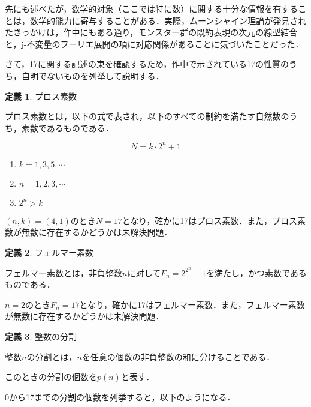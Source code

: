 \documentclass[10pt, a5paper, twoside]{jsarticle}
\theoremstyle{definition}
\newtheorem{dfn}{定義}
\begin{document}
			先にも述べたが，数学的対象（ここでは特に数）に関する十分な情報を有することは，数学的能力に寄与することがある．実際，ムーンシャイン理論が発見されたきっかけは，作中にもある通り，モンスター群の既約表現の次元の線型結合と，j-不変量のフーリエ展開の項に対応関係があることに気づいたことだった．

			さて，17に関する記述の束を確認するため，作中で示されている17の性質のうち，自明でないものを列挙して説明する．

			\begin{dfn}

				プロス素数\cite{proth}

				プロス素数とは，以下の式で表され，以下のすべての制約を満たす自然数のうち，素数であるものである．

				$$N = k \cdot 2^n + 1$$

				\begin{enumerate}
					\item $k = 1, 3, 5, \cdots$

					\item $n = 1, 2, 3, \cdots$

					\item $2^n > k$
				\end{enumerate}
				
			\end{dfn}

			$(n, k) = (4, 1)$のとき$N = 17$となり，確かに17はプロス素数．また，プロス素数が無数に存在するかどうかは未解決問題．

			\begin{dfn}

				フェルマー素数\cite{seisu}

				フェルマー素数とは，非負整数$n$に対して$F_n = 2^{2^n} + 1$を満たし，かつ素数であるものである．
				
			\end{dfn}

			$n = 2$のとき$F_n = 17$となり，確かに17はフェルマー素数．また，フェルマー素数が無数に存在するかどうかは未解決問題．

			\begin{dfn}

				整数の分割\cite{ram}

				整数$n$の分割とは，$n$を任意の個数の非負整数の和に分けることである．

				このときの分割の個数を$p(n)$と表す．
				
			\end{dfn}

			0から17までの分割の個数を列挙すると，以下のようになる\cite{17}．
\end{document}

